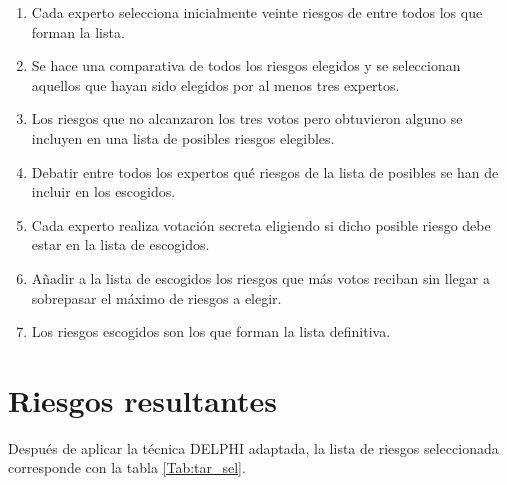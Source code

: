 \documentclass[11pt,a4paper,spanish,twoside]{report}
\begin{document}
\begin{enumerate}
\item Cada experto selecciona inicialmente veinte riesgos de entre todos los que
  forman la lista.
\item Se hace una comparativa de todos los riesgos elegidos y se seleccionan
  aquellos que hayan sido elegidos por al menos tres expertos.
\item Los riesgos que no alcanzaron los tres votos pero obtuvieron alguno se
  incluyen en una lista de posibles riesgos elegibles. 
\item Debatir entre todos los expertos qué riesgos de la lista de posibles se 
han de incluir en los escogidos. 
\item Cada experto realiza votación secreta eligiendo si dicho posible riesgo 
debe estar en la lista de escogidos.
\item Añadir a la lista de escogidos los riesgos que más votos reciban sin 
llegar a sobrepasar el máximo de riesgos a elegir.
\item Los riesgos escogidos son los que forman la lista definitiva.
\end{enumerate}

\section{Riesgos resultantes}
Después de aplicar la técnica DELPHI adaptada, la lista de riesgos
seleccionada corresponde con la tabla \ref{Tab:tar_sel}.
\end{document}
